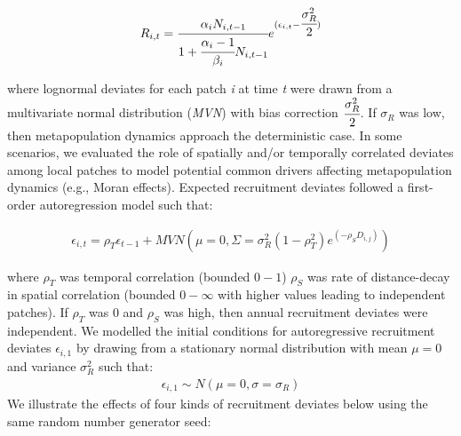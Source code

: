 \documentclass[
]{article}
\begin{document}
\begin{align}
R_{i,t}=\cfrac{\alpha_iN_{i,t-1}}{1+\cfrac{\alpha_i-1}{\beta_i}N_{i,t-1}}e^{(\epsilon_{i,t}-\cfrac{\sigma_{R}^2}{2})}
\end{align}

where lognormal deviates for each patch \emph{i} at time \emph{t} were
drawn from a multivariate normal distribution (\emph{MVN}) with bias
correction \(\cfrac{\sigma_{R}^2}{2}\). If \(\sigma_R\) was low, then
metapopulation dynamics approach the deterministic case. In some
scenarios, we evaluated the role of spatially and/or temporally
correlated deviates among local patches to model potential common
drivers affecting metapopulation dynamics (e.g., Moran effects).
Expected recruitment deviates followed a first-order autoregression
model such that:

\begin{align}
\epsilon_{i,t}=\rho_T\epsilon_{t-1}+MVN(\mu=0,\Sigma=\sigma_R^2(1-\rho_T^2)e^{(-\rho_SD_{i,j})})
\end{align}

where \(\rho_T\) was temporal correlation (bounded \(0-1\)) \(\rho_S\)
was rate of distance-decay in spatial correlation (bounded \(0-\infty\)
with higher values leading to independent patches). If \(\rho_T\) was 0
and \(\rho_S\) was high, then annual recruitment deviates were
independent. We modelled the initial conditions for autoregressive
recruitment deviates \(\epsilon_{i,1}\) by drawing from a stationary
normal distribution with mean \(\mu=0\) and variance \(\sigma_R^2\) such
that: \begin{align}
\epsilon_{i,1} \sim N(\mu=0,\sigma=\sigma_R)
\end{align} We illustrate the effects of four kinds of recruitment
deviates below using the same random number generator seed:
\end{document}
